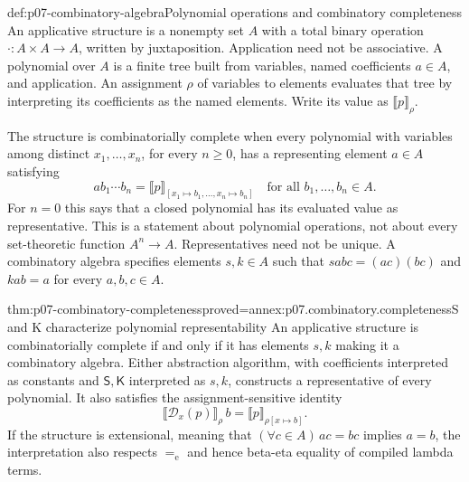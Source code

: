 \begin{hbdefinition}{def:p07-combinatory-algebra}{Polynomial operations and combinatory completeness}
An applicative structure is a nonempty set \(A\) with a total binary operation
\(\cdot:A\times A\to A\), written by juxtaposition.  Application need not be
associative.  A polynomial over \(A\) is a finite tree built from variables,
named coefficients \(a\in A\), and application.  An assignment \(\rho\) of
variables to elements evaluates that tree by interpreting its coefficients as
the named elements.  Write its value as \(\llbracket p\rrbracket_\rho\).

The structure is combinatorially complete when every polynomial with variables
among distinct \(x_1,\ldots,x_n\), for every \(n\geq0\), has a representing
element \(a\in A\) satisfying
\[
 a b_1\cdots b_n=
 \llbracket p\rrbracket_{[x_1\mapsto b_1,\ldots,x_n\mapsto b_n]}
 \quad\text{for all }b_1,\ldots,b_n\in A.
\]
For \(n=0\) this says that a closed polynomial has its evaluated value as
representative.  This is a statement about polynomial operations, not about
every set-theoretic function \(A^n\to A\).  Representatives need not be unique.
A combinatory algebra specifies elements \(s,k\in A\) such that
\(sabc=(ac)(bc)\) and \(kab=a\) for every \(a,b,c\in A\).
\end{hbdefinition}

\begin{hbtheorem}{thm:p07-combinatory-completeness}{proved=annex:p07.combinatory.completeness}{S and K characterize polynomial representability}
An applicative structure is combinatorially complete if and only if it has
elements \(s,k\) making it a combinatory algebra.  Either abstraction algorithm,
with coefficients interpreted as constants and \(\mathsf S,\mathsf K\)
interpreted as \(s,k\), constructs a representative of every polynomial.
It also satisfies the assignment-sensitive identity
\[
 \llbracket\mathcal D_x(p)\rrbracket_\rho\,b
       =\llbracket p\rrbracket_{\rho[x\mapsto b]}.
\]
If the structure is extensional, meaning that
\((\forall c\in A)\,ac=bc\) implies \(a=b\), the interpretation also respects
\(=_{\mathrm e}\) and hence beta-eta equality of compiled lambda terms.
\end{hbtheorem}

